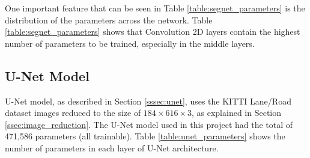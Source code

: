 \documentclass[10pt,twocolumn,letterpaper]{article}
\begin{document}
One important feature that can be seen in Table \ref{table:segnet_parameters} is the distribution of the parameters across the network. Table \ref{table:segnet_parameters} shows that Convolution 2D layers contain the highest number of parameters to be trained, especially in the middle layers.

\subsection{U-Net Model} \label{ssec:unet_model}

U-Net model, as described in Section \ref{sssec:unet}, uses the KITTI Lane/Road dataset images reduced to the size of $ 184 \times 616 \times 3$, as explained in Section \ref{ssec:image_reduction}. The U-Net model used in this project had the total of 471,586 parameters (all trainable). Table \ref{table:unet_parameters} shows the number of parameters in each layer of U-Net architecture.
\end{document}
